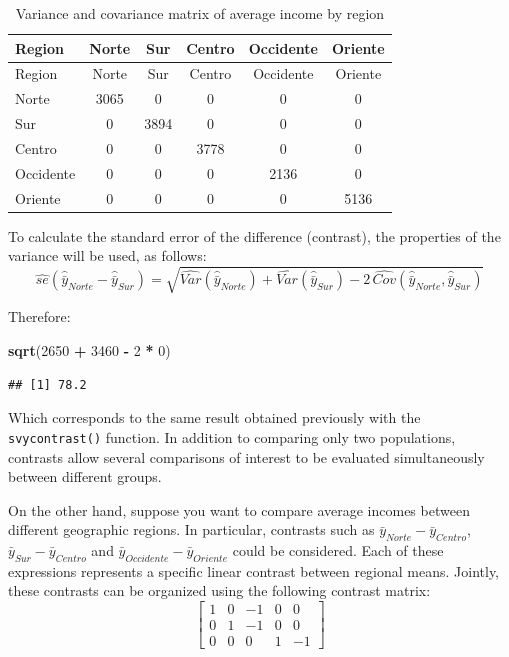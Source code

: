 \documentclass[
  english,
  12pt,
]{book}
\newenvironment{Shaded}{\begin{snugshade}}{\end{snugshade}}
\newcommand{\DecValTok}[1]{\textcolor[rgb]{0.00,0.00,0.81}{#1}}
\newcommand{\FunctionTok}[1]{\textcolor[rgb]{0.13,0.29,0.53}{\textbf{#1}}}
\newcommand{\NormalTok}[1]{#1}
\newcommand{\SpecialCharTok}[1]{\textcolor[rgb]{0.81,0.36,0.00}{\textbf{#1}}}
\begin{document}
\begin{longtable}[]{@{}lccccc@{}}
\caption{\label{tab:tab-vcov-region}Variance and covariance matrix of average income by region}\tabularnewline
\toprule\noalign{}
Region & Norte & Sur & Centro & Occidente & Oriente \\
\midrule\noalign{}
\endfirsthead
\toprule\noalign{}
Region & Norte & Sur & Centro & Occidente & Oriente \\
\midrule\noalign{}
\endhead
\bottomrule\noalign{}
\endlastfoot
Norte & 3065 & 0 & 0 & 0 & 0 \\
Sur & 0 & 3894 & 0 & 0 & 0 \\
Centro & 0 & 0 & 3778 & 0 & 0 \\
Occidente & 0 & 0 & 0 & 2136 & 0 \\
Oriente & 0 & 0 & 0 & 0 & 5136 \\
\end{longtable}

To calculate the standard error of the difference (contrast), the properties of the variance will be used, as follows:
\[
\widehat{se}\left(\hat{\bar{y}}_{Norte}-\hat{\bar{y}}_{Sur}\right)=\sqrt{\widehat {Var}\left(\hat{\bar{y}}_{Norte}\right)+
\widehat{Var}\left(\hat{\bar{y}}_{Sur}\right)-
2\, \widehat{Cov}\left(\hat{\bar{y}}_{Norte},\hat{\bar{y}}_{Sur}\right)}
\]

Therefore:

\begin{Shaded}
\begin{Highlighting}[]
\FunctionTok{sqrt}\NormalTok{(}\DecValTok{2650} \SpecialCharTok{+} \DecValTok{3460} \SpecialCharTok{{-}} \DecValTok{2} \SpecialCharTok{*} \DecValTok{0}\NormalTok{)}
\end{Highlighting}
\end{Shaded}

\begin{verbatim}
## [1] 78.2
\end{verbatim}

Which corresponds to the same result obtained previously with the \texttt{svycontrast()} function. In addition to comparing only two populations, contrasts allow several comparisons of interest to be evaluated simultaneously between different groups.

On the other hand, suppose you want to compare average incomes between different geographic regions. In particular, contrasts such as \(\bar{y}_{Norte} - \bar{y}_{Centro}\), \(\bar{y}_{Sur} - \bar{y}_{Centro}\) and \(\bar{y}_{Occidente} - \bar{y}_{Oriente}\) could be considered. Each of these expressions represents a specific linear contrast between regional means. Jointly, these contrasts can be organized using the following contrast matrix:
\[
\left[\begin{array}{ccccc}
1 & 0 & -1 & 0 & 0\\
0 & 1 & -1 & 0 & 0\\
0 & 0 & 0 & 1 & -1
\end{array}\right]
\]
\end{document}

